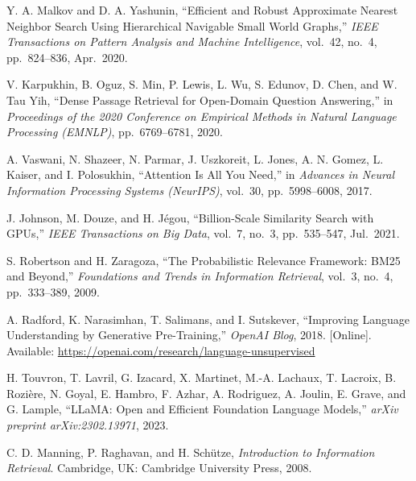 \begin{flushleft}
\noindent[7]\hspace{6pt}
Y. A. Malkov and D. A. Yashunin,
``Efficient and Robust Approximate Nearest Neighbor Search Using Hierarchical
Navigable Small World Graphs,''
\textit{IEEE Transactions on Pattern Analysis and Machine Intelligence},
vol.~42, no.~4, pp.~824--836, Apr.\ 2020.

\noindent[8]\hspace{6pt}
V. Karpukhin, B. Oguz, S. Min, P. Lewis, L. Wu, S. Edunov, D. Chen, and
W. Tau Yih,
``Dense Passage Retrieval for Open-Domain Question Answering,''
in \textit{Proceedings of the 2020 Conference on Empirical Methods in Natural
Language Processing (EMNLP)}, pp.~6769--6781, 2020.

\noindent[9]\hspace{6pt}
A. Vaswani, N. Shazeer, N. Parmar, J. Uszkoreit, L. Jones, A. N. Gomez,
L. Kaiser, and I. Polosukhin,
``Attention Is All You Need,''
in \textit{Advances in Neural Information Processing Systems (NeurIPS)},
vol.~30, pp.~5998--6008, 2017.

\noindent[10]\hspace{6pt}
J. Johnson, M. Douze, and H. Jégou,
``Billion-Scale Similarity Search with GPUs,''
\textit{IEEE Transactions on Big Data},
vol.~7, no.~3, pp.~535--547, Jul.\ 2021.

\noindent[11]\hspace{6pt}
S. Robertson and H. Zaragoza,
``The Probabilistic Relevance Framework: BM25 and Beyond,''
\textit{Foundations and Trends in Information Retrieval},
vol.~3, no.~4, pp.~333--389, 2009.

\noindent[12]\hspace{6pt}
A. Radford, K. Narasimhan, T. Salimans, and I. Sutskever,
``Improving Language Understanding by Generative Pre-Training,''
\textit{OpenAI Blog}, 2018. [Online]. Available:
\url{https://openai.com/research/language-unsupervised}

\noindent[13]\hspace{6pt}
H. Touvron, T. Lavril, G. Izacard, X. Martinet, M.-A. Lachaux,
T. Lacroix, B. Rozière, N. Goyal, E. Hambro, F. Azhar,
A. Rodriguez, A. Joulin, E. Grave, and G. Lample,
``LLaMA: Open and Efficient Foundation Language Models,''
\textit{arXiv preprint arXiv:2302.13971}, 2023.

\noindent[14]\hspace{6pt}
C. D. Manning, P. Raghavan, and H. Schütze,
\textit{Introduction to Information Retrieval}.
Cambridge, UK: Cambridge University Press, 2008.


\end{flushleft}
